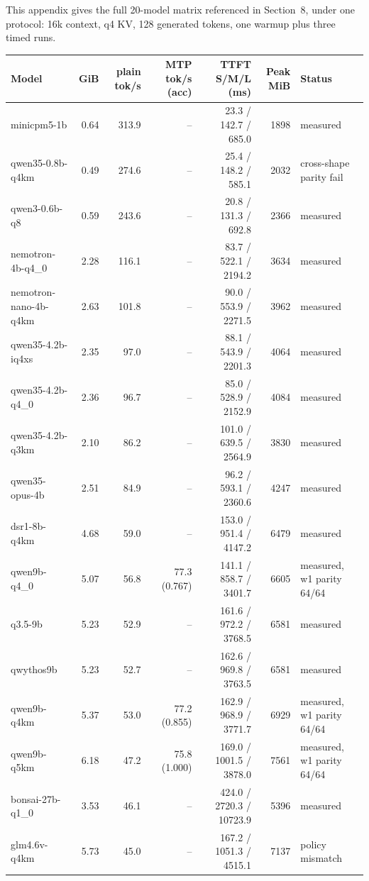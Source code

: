 \documentclass[letterpaper,twocolumn,10pt]{article}
\begin{document}
This appendix gives the full 20-model matrix referenced in Section~8, under
one protocol: 16k context, q4 KV, 128 generated tokens, one warmup plus three
timed runs.

\begin{table}[t]
\centering
\scriptsize
\setlength{\tabcolsep}{3pt}
\begin{tabular}{@{}lrrrrrl@{}}
\toprule
Model & GiB & plain tok/s & MTP tok/s (acc) & TTFT S/M/L (ms) & Peak MiB & Status \\
\midrule
minicpm5-1b & 0.64 & 313.9 & -- & 23.3 / 142.7 / 685.0 & 1898 & measured \\
qwen35-0.8b-q4km & 0.49 & 274.6 & -- & 25.4 / 148.2 / 585.1 & 2032 & cross-shape parity fail \\
qwen3-0.6b-q8 & 0.59 & 243.6 & -- & 20.8 / 131.3 / 692.8 & 2366 & measured \\
nemotron-4b-q4\_0 & 2.28 & 116.1 & -- & 83.7 / 522.1 / 2194.2 & 3634 & measured \\
nemotron-nano-4b-q4km & 2.63 & 101.8 & -- & 90.0 / 553.9 / 2271.5 & 3962 & measured \\
qwen35-4.2b-iq4xs & 2.35 & 97.0 & -- & 88.1 / 543.9 / 2201.3 & 4064 & measured \\
qwen35-4.2b-q4\_0 & 2.36 & 96.7 & -- & 85.0 / 528.9 / 2152.9 & 4084 & measured \\
qwen35-4.2b-q3km & 2.10 & 86.2 & -- & 101.0 / 639.5 / 2564.9 & 3830 & measured \\
qwen35-opus-4b & 2.51 & 84.9 & -- & 96.2 / 593.1 / 2360.6 & 4247 & measured \\
dsr1-8b-q4km & 4.68 & 59.0 & -- & 153.0 / 951.4 / 4147.2 & 6479 & measured \\
qwen9b-q4\_0 & 5.07 & 56.8 & 77.3 (0.767) & 141.1 / 858.7 / 3401.7 & 6605 & measured, w1 parity 64/64 \\
q3.5-9b & 5.23 & 52.9 & -- & 161.6 / 972.2 / 3768.5 & 6581 & measured \\
qwythos9b & 5.23 & 52.7 & -- & 162.6 / 969.8 / 3763.5 & 6581 & measured \\
qwen9b-q4km & 5.37 & 53.0 & 77.2 (0.855) & 162.9 / 968.9 / 3771.7 & 6929 & measured, w1 parity 64/64 \\
qwen9b-q5km & 6.18 & 47.2 & 75.8 (1.000) & 169.0 / 1001.5 / 3878.0 & 7561 & measured, w1 parity 64/64 \\
bonsai-27b-q1\_0 & 3.53 & 46.1 & -- & 424.0 / 2720.3 / 10723.9 & 5396 & measured \\
glm4.6v-q4km & 5.73 & 45.0 & -- & 167.2 / 1051.3 / 4515.1 & 7137 & policy mismatch \\

\end{tabular}
\end{table}
\end{document}
